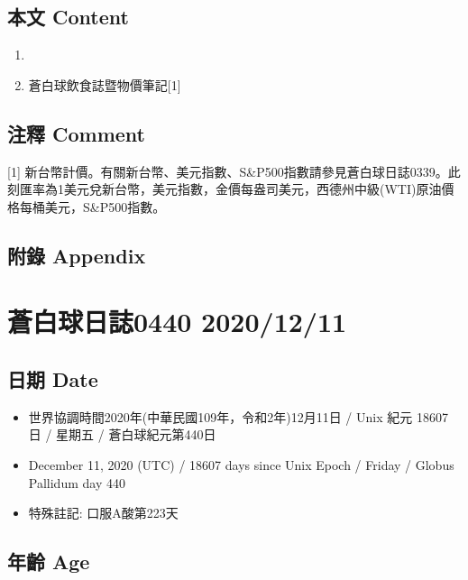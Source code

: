 \documentclass[a5paper, 11pt
]{book}
\providecommand{\tightlist}{%
  \setlength{\itemsep}{0pt}\setlength{\parskip}{0pt}}
\begin{document}
\hypertarget{ux672cux6587-content-9}{%
\subsection{本文 Content}\label{ux672cux6587-content-9}}

\begin{enumerate}
\def\labelenumi{\arabic{enumi}.}
\tightlist
\item
\item
  蒼白球飲食誌暨物價筆記{[}1{]}
\end{enumerate}

\hypertarget{ux6ce8ux91cb-comment-9}{%
\subsection{注釋 Comment}\label{ux6ce8ux91cb-comment-9}}

{[}1{]}
新台幣計價。有關新台幣、美元指數、S\&P500指數請參見蒼白球日誌0339。此刻匯率為1美元兌新台幣，美元指數，金價每盎司美元，西德州中級(WTI)原油價格每桶美元，S\&P500指數。

\hypertarget{ux9644ux9304-appendix-9}{%
\subsection{附錄 Appendix}\label{ux9644ux9304-appendix-9}}

\hypertarget{ux84bcux767dux7403ux65e5ux8a8c0440-20201211}{%
\section{蒼白球日誌0440
2020/12/11}\label{ux84bcux767dux7403ux65e5ux8a8c0440-20201211}}

\hypertarget{ux65e5ux671f-date-10}{%
\subsection{日期 Date}\label{ux65e5ux671f-date-10}}

\begin{itemize}
\tightlist
\item
  世界協調時間2020年(中華民國109年，令和2年)12月11日 / Unix 紀元 18607
  日 / 星期五 / 蒼白球紀元第440日
\item
  December 11, 2020 (UTC) / 18607 days since Unix Epoch / Friday /
  Globus Pallidum day 440
\item
  特殊註記: 口服A酸第223天
\end{itemize}

\hypertarget{ux5e74ux9f61-age-10}{%
\subsection{年齡 Age}\label{ux5e74ux9f61-age-10}}
\end{document}
